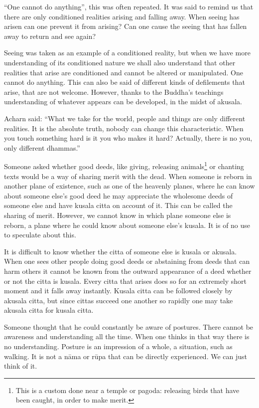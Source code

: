 ``One cannot do anything'', this was often repeated. It was said to
remind us that there are only conditioned realities arising and falling
away. When seeing has arisen can one prevent it from arising? Can one
cause the seeing that has fallen away to return and see again?

Seeing was taken as an example of a conditioned reality, but when we
have more understanding of its conditioned nature we shall also
understand that other realities that arise are conditioned and cannot be
altered or manipulated. One cannot do anything. This can also be said of
different kinds of defilements that arise, that are not welcome.
However, thanks to the Buddha's teachings understanding of whatever
appears can be developed, in the midst of akusala.

Acharn said: ``What we take for the world, people and things are only
different realities. It is the absolute truth, nobody can change this
characteristic. When you touch something hard is it you who makes it
hard? Actually, there is no you, only different dhammas.''

Someone asked whether good deeds, like giving, releasing animals\footnote{This is a custom done
near a temple or pagoda: releasing birds that have been caught, in order
to make merit.} or chanting texts would
be a way of sharing merit with the dead. When someone is reborn in
another plane of existence, such as one of the heavenly planes, where he
can know about someone else's good deed he may appreciate the wholesome
deeds of someone else and have kusala citta on account of it. This can
be called the sharing of merit. However, we cannot know in which plane
someone else is reborn, a plane where he could know about someone else's
kusala. It is of no use to speculate about this.

It is difficult to know whether the citta of someone else is kusala or
akusala. When one sees other people doing good deeds or abstaining from
deeds that can harm others it cannot be known from the outward
appearance of a deed whether or not the citta is kusala. Every citta
that arises does so for an extremely short moment and it falls away
instantly. Kusala citta can be followed closely by akusala citta, but
since cittas succeed one another so rapidly one may take akusala citta
for kusala citta.

Someone thought that he could constantly be aware of postures. There
cannot be awareness and understanding all the time. When one thinks in
that way there is no understanding. Posture is an impression of a whole,
a situation, such as walking. It is not a nāma or rūpa that can be
directly experienced. We can just think of it.

